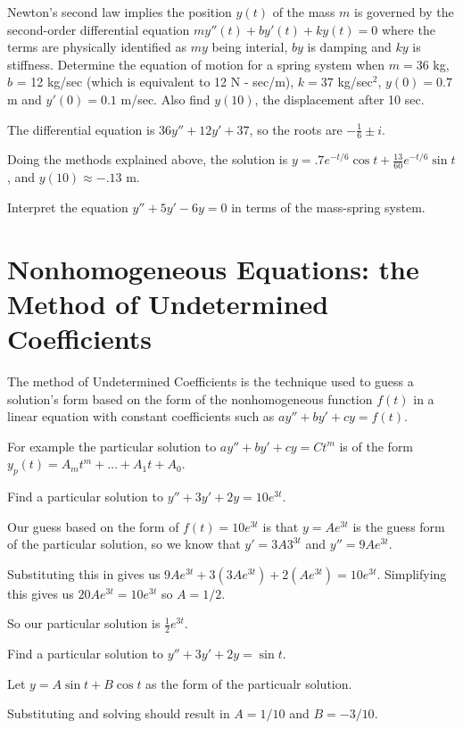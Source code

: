 \documentclass[../diffeq.tex]{subfiles}
\begin{document}
\begin{example}
    Newton's second law implies the position $y(t)$ of the mass $m$ is governed by the second-order differential equation $my''(t)+by'(t)+ky(t)=0$ where the terms are physically identified as $my$ being interial, $by$ is damping and $ky$ is stiffness.
    Determine the equation of motion for a spring system when $m=36$ kg, $b$ = 12 kg/sec (which is equivalent to 12 N - sec/m), $k=37$ kg/sec$^2$, $y(0)=0.7$ m and $y'(0) = 0.1$ m/sec. Also find $y(10)$, the displacement after 10 sec.

    The differential equation is $36y''+12y'+37$, so the roots are $-\frac{1}{6}\pm i$.

    Doing the methods explained above, the solution is $y=.7e^{-t/6}\cos t + \frac{13}{60}e^{-t/6}\sin t$, and $y(10)\approx -.13$ m.
\end{example}
\ex Interpret the equation $y''+5y'-6y=0$ in terms of the mass-spring system.

\section{Nonhomogeneous Equations: the Method of Undetermined Coefficients}
The method of Undetermined Coefficients is the technique used to guess a solution's form based on the form of the nonhomogeneous function $f(t)$ in a linear equation with 
constant coefficients such as $ay''+by'+cy=f(t)$.

For example the particular solution to $ay''+by'+cy=Ct^m$ is of the form $y_p(t)=A_mt^m+\dots+A_1t+A_0$.

\begin{example}
    Find a particular solution to $y''+3y'+2y=10e^{3t}$.

    Our guess based on the form of $f(t)=10e^{3t}$ is that $y=Ae^{3t}$ is the guess form of the particular solution, so we know that $y'=3A3^{3t}$ and $y''=9Ae^{3t}$.

    Substituting this in gives us $9Ae^{3t}+3(3Ae^{3t})+2(Ae^{3t})=10e^{3t}$. Simplifying this gives us $20Ae^{3t}=10e^{3t}$ so $A=1/2$.

    So our particular solution is $\frac{1}{2}e^{3t}$.
\end{example}

\begin{example}
    Find a particular solution to $y''+3y'+2y=\sin t$.

    Let $y=A\sin t + B\cos t$ as the form of the particualr solution.

    Substituting and solving should result in $A=1/10$ and $B=-3/10$. 
\end{example}
\end{document}
